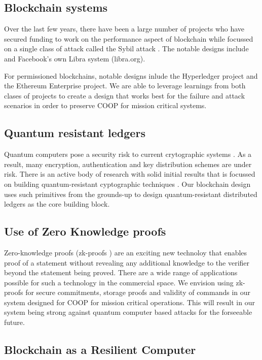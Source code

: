 \subsection{Blockchain systems}
Over the last few years, there have been a large number of projects who have secured funding
to work on the performance aspect of blockchain while focussed on a single class of attack
called the Sybil attack \cite{john2002}. The notable designs include \cite{rapidchain, chainspace, ava2018, thundertoken} and Facebook's own Libra system (libra.org).

For permissioned blockchains, notable designs inlude the Hyperledger project and the Ethereum Enterprise project. We are
able to leverage learnings from both clases of projects to create a design that works best for the failure and
attack scenarios in order to preserve COOP for mission critical systems.

\subsection{Quantum resistant ledgers}

Quantum computers pose a security risk to current crytographic systems \cite{dasgupta2019}. As a result, many
encryption, authentication and key distribution schemes are under risk. There is an active body of research with solid
initial results that is focussed on building quantum-resistant cyptographic techniques \cite{qrl2016}. Our blockchain design
uses such primitives from the grounds-up to design quantum-resistant distributed ledgers as the core building block.

\subsection{Use of Zero Knowledge proofs}

Zero-knowledge proofs (zk-proofs \cite{bunz2018}) are an exciting new technoloy that enables proof of a statement without revealing any additional
knowledge to the verifier beyond the statement being proved. There are a wide range of applications possible for such
a technology in the commercial space. We envision using zk-proofs for secure commitments, storage proofs and validity of
commands in our system designed for COOP for mission critical operations. This will result in our system being strong
against quantum computer based attacks for the forseeable future.

\subsection{Blockchain as a Resilient Computer}

